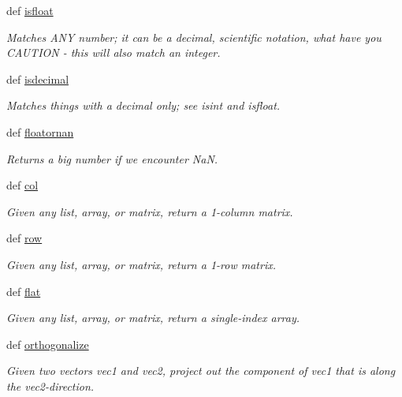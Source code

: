 \begin{DoxyCompactItemize}
def \hyperlink{namespaceforcebalance_1_1nifty_a8e3ef0108b9d37b82ba0dced7c6037ae}{isfloat}
\begin{DoxyCompactList}\small\item\em Matches A\-N\-Y number; it can be a decimal, scientific notation, what have you C\-A\-U\-T\-I\-O\-N -\/ this will also match an integer. \end{DoxyCompactList}\item 
def \hyperlink{namespaceforcebalance_1_1nifty_a09263927eaec9deff283fbf1a820242f}{isdecimal}
\begin{DoxyCompactList}\small\item\em Matches things with a decimal only; see isint and isfloat. \end{DoxyCompactList}\item 
def \hyperlink{namespaceforcebalance_1_1nifty_a8d63c8ae9a67c66673a6cf81357f827d}{floatornan}
\begin{DoxyCompactList}\small\item\em Returns a big number if we encounter Na\-N. \end{DoxyCompactList}\item 
def \hyperlink{namespaceforcebalance_1_1nifty_afb3f205bce4984856e766af7e9fdaca8}{col}
\begin{DoxyCompactList}\small\item\em Given any list, array, or matrix, return a 1-\/column matrix. \end{DoxyCompactList}\item 
def \hyperlink{namespaceforcebalance_1_1nifty_a6c9727360cdff8f3011a12cc54d0e86e}{row}
\begin{DoxyCompactList}\small\item\em Given any list, array, or matrix, return a 1-\/row matrix. \end{DoxyCompactList}\item 
def \hyperlink{namespaceforcebalance_1_1nifty_a52114ceee9d55f94d9aecb3e176de294}{flat}
\begin{DoxyCompactList}\small\item\em Given any list, array, or matrix, return a single-\/index array. \end{DoxyCompactList}\item 
def \hyperlink{namespaceforcebalance_1_1nifty_a7676236002c6a65ea7d2e69a09923889}{orthogonalize}
\begin{DoxyCompactList}\small\item\em Given two vectors vec1 and vec2, project out the component of vec1 that is along the vec2-\/direction. \end{DoxyCompactList}\item 

\end{DoxyCompactItemize}
